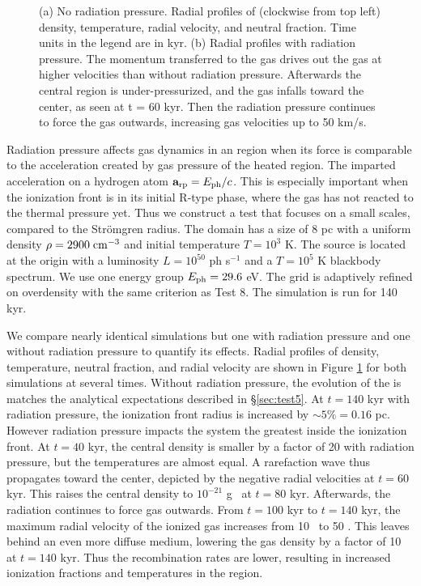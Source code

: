 \documentclass[useAMS,usenatbib,a4paper]{mn2e}
\begin{document}
\begin{figure}
  \caption{\label{fig:rp_profiles} (a) No radiation pressure.
    Radial profiles of (clockwise from top left) density, temperature,
    radial velocity, and neutral fraction.  Time units in the legend
    are in kyr.  (b) Radial profiles with radiation pressure.  The
    momentum transferred to the gas drives out the gas at higher
    velocities than without radiation pressure.  Afterwards the
    central region is under-pressurized, and the gas infalls toward the
    center, as seen at t = 60 kyr.  Then the radiation pressure
    continues to force the gas outwards, increasing gas velocities up
    to 50 km/s.}
\end{figure}

Radiation pressure affects gas dynamics in an \hii region when
its force is comparable to the acceleration created by gas pressure of
the heated region.  The imparted acceleration on a hydrogen atom
$\mathbf{a}_{\rm rp} = E_{\rm ph}/c$.  This is especially important
when the ionization front is in its initial R-type phase, where the
gas has not reacted to the thermal pressure yet.  Thus we construct a
test that focuses on a small scales, compared to the Str\"{o}mgren
radius.  The domain has a size of 8 pc with a uniform density $\rho =
2900\;\cubecm$ and initial temperature $T = 10^3$ K.  The source is
located at the origin with a luminosity $L = 10^{50}$ ph s$^{-1}$ and
a $T=10^5$ K blackbody spectrum.  We use one energy group $E_{\rm ph}
= 29.6$ eV.  The grid is adaptively refined on overdensity with the
same criterion as Test 8.  The simulation is run for 140 kyr.

We compare nearly identical simulations but one with radiation
pressure and one without radiation pressure to quantify its effects.
Radial profiles of density, temperature, neutral fraction, and radial
velocity are shown in Figure \ref{fig:rp_profiles} for both
simulations at several times.  Without radiation pressure, the
evolution of the \hii is matches the analytical expectations
described in \S\ref{sec:test5}.  At $t=140$ kyr with radiation
pressure, the ionization front radius is increased by $\sim5\% = 0.16$
pc.  However radiation pressure impacts the system the greatest inside
the ionization front.  At $t = 40$ kyr, the central density is smaller
by a factor of 20 with radiation pressure, but the temperatures are
almost equal.  A rarefaction wave thus propagates toward the center,
depicted by the negative radial velocities at $t = 60$ kyr.  This
raises the central density to $10^{-21}$ g \cubecm~at $t = 80$ kyr.
Afterwards, the radiation continues to force gas outwards.  From $t =
100$ kyr to $t = 140$ kyr, the maximum radial velocity of the ionized
gas increases from 10 \kms~to 50 \kms.  This leaves behind an even
more diffuse medium, lowering the gas density by a factor of 10 at $t
= 140$ kyr.  Thus the recombination rates are lower, resulting in
increased ionization fractions and temperatures in the \hii
region.
\end{document}
